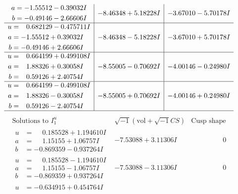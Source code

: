 \documentclass[1p]{elsarticle_modified}
\theoremstyle{definition}
\newcommand{\I}{\sqrt{-1}}
\begin{document}
$$\begin{array}{c|c|c}
\begin{aligned}
a &= -1.55512 - 0.39032 I \\
b &= -0.49146 - 2.66606 I\end{aligned}
 & -8.46348 + 5.18228 I & -3.67010 - 5.70178 I \\ \hline\begin{aligned}
u &= \phantom{-}0.682129 - 0.475711 I \\
a &= -1.55512 + 0.39032 I \\
b &= -0.49146 + 2.66606 I\end{aligned}
 & -8.46348 - 5.18228 I & -3.67010 + 5.70178 I \\ \hline\begin{aligned}
u &= \phantom{-}0.664199 + 0.499108 I \\
a &= \phantom{-}1.88326 + 0.30058 I \\
b &= \phantom{-}0.59126 + 2.40754 I\end{aligned}
 & -8.55005 - 0.70692 I & -4.00146 - 0.24980 I \\ \hline\begin{aligned}
u &= \phantom{-}0.664199 - 0.499108 I \\
a &= \phantom{-}1.88326 - 0.30058 I \\
b &= \phantom{-}0.59126 - 2.40754 I\end{aligned}
 & -8.55005 + 0.70692 I & -4.00146 + 0.24980 I\\
 \hline 
 \end{array}$$\newpage$$\begin{array}{c|c|c}  
\text{Solutions to }I^u_{1}& \I (\text{vol} + \sqrt{-1}CS) & \text{Cusp shape}\\
 \hline 
\begin{aligned}
u &= \phantom{-}0.185528 + 1.194610 I \\
a &= \phantom{-}1.15155 + 1.06757 I \\
b &= -0.869359 - 0.937264 I\end{aligned}
 & -7.53088 + 3.11306 I & \phantom{-0.000000 } 0 \\ \hline\begin{aligned}
u &= \phantom{-}0.185528 - 1.194610 I \\
a &= \phantom{-}1.15155 - 1.06757 I \\
b &= -0.869359 + 0.937264 I\end{aligned}
 & -7.53088 - 3.11306 I & \phantom{-0.000000 } 0 \\ \hline\begin{aligned}
u &= -0.634915 + 0.454764 I \\

\end{aligned}
\end{array}$$
\end{document}
